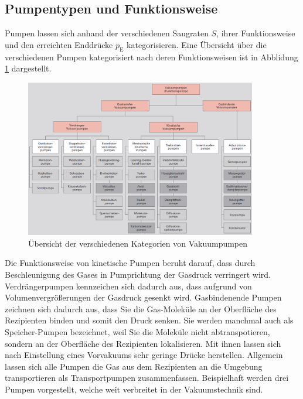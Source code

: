 \subsection{Pumpentypen und Funktionsweise}
Pumpen lassen sich anhand der verschiedenen Saugraten $S$, ihrer Funktionsweise und den erreichten Enddrücke $p_\text{E}$ kategorisieren. Eine Übersicht über die verschiedenen Pumpen kategorisiert nach deren Funktionsweisen ist in Abblidung \ref{fig:Uebersicht} dargestellt.
\begin{figure}[htbp]
  \centering
  \includegraphics[width=0.9\textwidth]{picture/Uebersicht.png}
  \caption{Übersicht der verschiedenen Kategorien von Vakuumpumpen \cite{Uebersicht}}
  \label{fig:Uebersicht}
\end{figure}
Die Funktionsweise von kinetische Pumpen beruht darauf, dass durch Beschleunigung des Gases in Pumprichtung der Gasdruck verringert wird.
Verdrängerpumpen kennzeichen sich dadurch aus, dass aufgrund von Volumenvergrößerungen der Gasdruck gesenkt wird.
Gasbindenende Pumpen zeichnen sich dadurch aus, dass Sie die Gas-Moleküle an der Oberfläche des Rezipienten binden und somit den Druck senken. Sie werden manchmal auch als Speicher-Pumpen bezeichnet, weil Sie die Moleküle nicht abtranspotieren, sondern an der Oberfläche des Rezipienten lokalisieren. Mit ihnen lassen sich nach Einstellung eines Vorvakuums sehr geringe Drücke herstellen.
Allgemein lassen sich alle Pumpen die Gas aus dem Rezipienten an die Umgebung transportieren als Transportpumpen zusammenfassen.
Beispielhaft werden drei Pumpen vorgestellt, welche weit verbreitet in der Vakuumstechnik sind.
